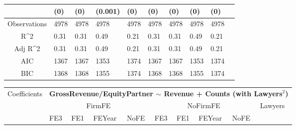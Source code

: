 \documentclass{article}
\begin{document}
\begin{table}[H]
\begin{tabular}{|clllllllll|}
   & (0) & (0) & (0.001) & (0) & (0) & (0) & (0) & (0) & \\ 
  \hline 
 Observations & 4978 & 4978 & 4978 & 4978 & 4978 & 4978 & 4978 & 4978 & \\ 
  R^2 & 0.31 & 0.31 & 0.49 & 0.21 & 0.31 & 0.31 & 0.49 & 0.21 & \\ 
  Adj R^2 & 0.31 & 0.31 & 0.49 & 0.21 & 0.31 & 0.31 & 0.49 & 0.21 & \\ 
  AIC & 1367 & 1367 & 1353 & 1374 & 1367 & 1367 & 1353 & 1374 & \\ 
  BIC & 1368 & 1368 & 1355 & 1374 & 1368 & 1368 & 1355 & 1374 & \\ 
   \hline
\end{tabular}
 
\end{table}


\begin{table}[H]
\centering
\begin{tabular}{|clllllllll|}
\hline
\multirow{3}{*}{Coefficients} & \multicolumn{9}{c|}{\textbf{GrossRevenue/EquityPartner $\sim$ Revenue + Counts (with Lawyers$^2$)}} \\
\cline{2-10}
& \multicolumn{4}{c}{FirmFE} & \multicolumn{4}{c}{NoFirmFE} & \multirow{2}{*}{Lawyers} \\
\cline{2-9}
& FE3 & FE1 & FEYear & NoFE & FE3 & FE1 & FEYear & NoFE &  \\
\hline
 

\end{tabular}
\end{table}
\end{document}
